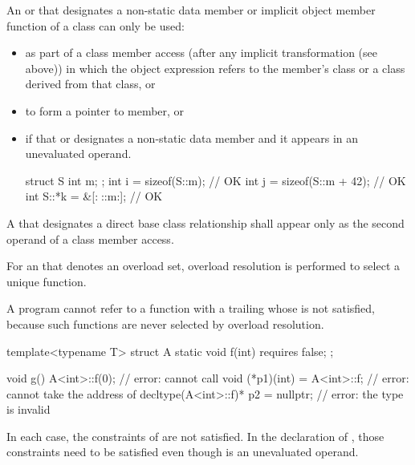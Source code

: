 \pnum
An  or 
that designates a non-static data member or
implicit object member function of a class can only be used:
\begin{itemize}
\item as part of a class member access
(after any implicit transformation (see above))
in which the
object expression
refers to the member's class
or a class derived from
that class, or

\item to form a pointer to member, or

\item if that  or 
designates a non-static data member
and it appears in an unevaluated operand.
\begin{example}
\begin{codeblock}
struct S {
  int m;
};
int i = sizeof(S::m);           // OK
int j = sizeof(S::m + 42);      // OK
int S::*k = &[:^^S::m:];        // OK
\end{codeblock}
\end{example}
\end{itemize}

\pnum
A  that designates a direct base class relationship
shall appear only as the second operand of a class member access.

\pnum
For an  that denotes an overload set,
overload resolution is performed
to select a unique function.
\begin{note}
A program cannot refer to a function
with a trailing 
whose  is not satisfied,
because such functions are never selected by overload resolution.
\begin{example}
\begin{codeblock}
template<typename T> struct A {
  static void f(int) requires false;
};

void g() {
  A<int>::f(0);                         // error: cannot call 
  void (*p1)(int) = A<int>::f;          // error: cannot take the address of 
  decltype(A<int>::f)* p2 = nullptr;    // error: the type  is invalid
}
\end{codeblock}
In each case, the constraints of  are not satisfied.
In the declaration of ,
those constraints need to be satisfied
even though
 is an unevaluated operand.
\end{example}
\end{note}

